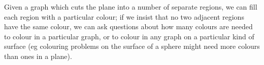 Given a graph which cuts the plane into a number of
separate regions, we can fill each region with a particular
colour; if we insist that no two adjacent regions have the
same colour, we can ask questions about how many colours
are needed to colour in a particular graph, or to colour
in any graph on a particular kind of surface (eg colouring 
problems on the surface of a sphere might need more colours 
than ones in a plane).